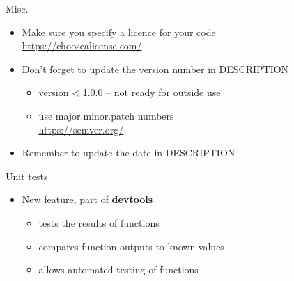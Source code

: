 \documentclass[
  ignorenonframetext,
  aspectratio=169]{beamer}
\providecommand{\tightlist}{%
  \setlength{\itemsep}{0pt}\setlength{\parskip}{0pt}}
\begin{document}
\begin{frame}{Misc.}
\protect\hypertarget{misc.}{}
\begin{itemize}
\tightlist
\item
  Make sure you specify a licence for your code\\
  \url{https://choosealicense.com/}
\item
  Don't forget to update the version number in DESCRIPTION

  \begin{itemize}
  \tightlist
  \item
    version \textless{} 1.0.0 -- not ready for outside use
  \item
    use major.minor.patch numbers\\
    \url{https://semver.org/}
  \end{itemize}
\item
  Remember to update the date in DESCRIPTION
\end{itemize}
\end{frame}

\begin{frame}{Unit tests}
\protect\hypertarget{unit-tests}{}
\begin{itemize}
\tightlist
\item
  New feature, part of \textbf{devtools}

  \begin{itemize}
  \tightlist
  \item
    tests the results of functions
  \item
    compares function outputs to known values
  \item
    allows automated testing of functions
  \end{itemize}
\end{itemize}
\end{frame}
\end{document}
